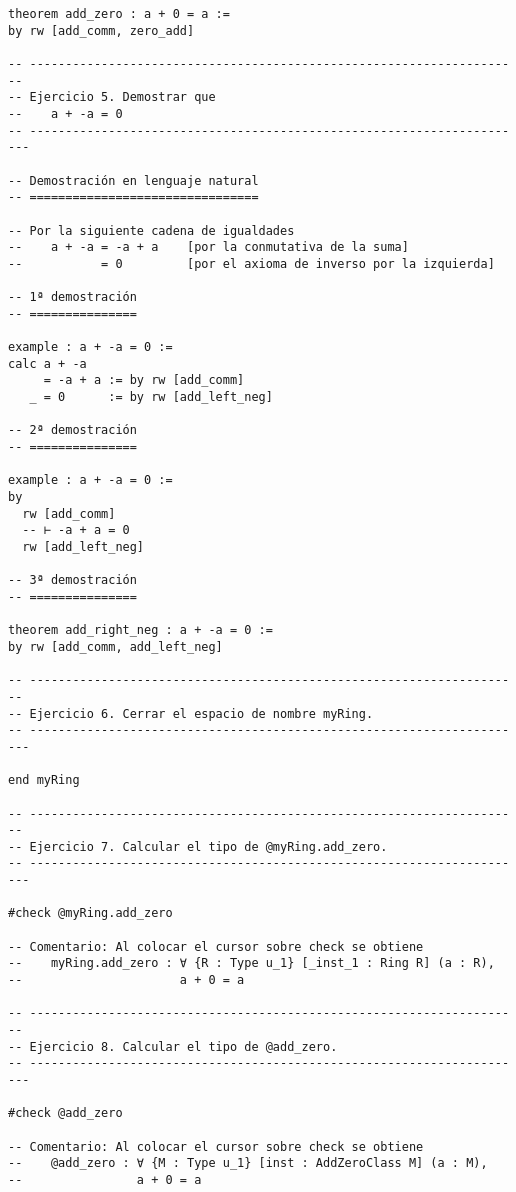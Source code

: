\begin{verbatim}
theorem add_zero : a + 0 = a :=
by rw [add_comm, zero_add]

-- ---------------------------------------------------------------------
-- Ejercicio 5. Demostrar que
--    a + -a = 0
-- ----------------------------------------------------------------------

-- Demostración en lenguaje natural
-- ================================

-- Por la siguiente cadena de igualdades
--    a + -a = -a + a    [por la conmutativa de la suma]
--           = 0         [por el axioma de inverso por la izquierda]

-- 1ª demostración
-- ===============

example : a + -a = 0 :=
calc a + -a
     = -a + a := by rw [add_comm]
   _ = 0      := by rw [add_left_neg]

-- 2ª demostración
-- ===============

example : a + -a = 0 :=
by
  rw [add_comm]
  -- ⊢ -a + a = 0
  rw [add_left_neg]

-- 3ª demostración
-- ===============

theorem add_right_neg : a + -a = 0 :=
by rw [add_comm, add_left_neg]

-- ---------------------------------------------------------------------
-- Ejercicio 6. Cerrar el espacio de nombre myRing.
-- ----------------------------------------------------------------------

end myRing

-- ---------------------------------------------------------------------
-- Ejercicio 7. Calcular el tipo de @myRing.add_zero.
-- ----------------------------------------------------------------------

#check @myRing.add_zero

-- Comentario: Al colocar el cursor sobre check se obtiene
--    myRing.add_zero : ∀ {R : Type u_1} [_inst_1 : Ring R] (a : R),
--                      a + 0 = a

-- ---------------------------------------------------------------------
-- Ejercicio 8. Calcular el tipo de @add_zero.
-- ----------------------------------------------------------------------

#check @add_zero

-- Comentario: Al colocar el cursor sobre check se obtiene
--    @add_zero : ∀ {M : Type u_1} [inst : AddZeroClass M] (a : M),
--                a + 0 = a
\end{verbatim}

